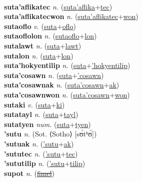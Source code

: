  \label{suta'aflika} \\
\textbf{suta'aflikatec} \textit{n.} (\hyperref[suta'aflika]{suta'aflika}+\hyperref[tec]{tec})
 \label{suta'aflikatec} \\
\textbf{suta'aflikatecwon} \textit{n.} (\hyperref[suta'aflikatec]{suta'aflikatec}+\hyperref[won]{won})
 \label{suta'aflikatecwon} \\
\textbf{sutaoflo} \textit{v.} (\hyperref[suta]{suta}+\hyperref[oflo]{oflo})
 \label{sutaoflo} \\
\textbf{sutaoflolon} \textit{n.} (\hyperref[sutaoflo]{sutaoflo}+\hyperref[lon]{lon})
 \label{sutaoflolon} \\
\textbf{sutalawt} \textit{n.} (\hyperref[suta]{suta}+\hyperref[lawt]{lawt})
 \label{sutalawt} \\
\textbf{sutalon} \textit{n.} (\hyperref[suta]{suta}+\hyperref[lon]{lon})
 \label{sutalon} \\
\textbf{suta'hokyentilip} \textit{n.} (\hyperref[suta]{suta}+\hyperref['hokyentilip]{'hokyentilip})
 \label{suta'hokyentilip} \\
\textbf{suta'cosawn} \textit{n.} (\hyperref[suta]{suta}+\hyperref['cosawn]{'cosawn})
 \label{suta'cosawn} \\
\textbf{suta'cosawnak} \textit{n.} (\hyperref[suta'cosawn]{suta'cosawn}+\hyperref[ak]{ak})
 \label{suta'cosawnak} \\
\textbf{suta'cosawnwon} \textit{n.} (\hyperref[suta'cosawn]{suta'cosawn}+\hyperref[won]{won})
 \label{suta'cosawnwon} \\
\textbf{sutaki} \textit{v.} (\hyperref[suta]{suta}+\hyperref[ki]{ki})
 \label{sutaki} \\
\textbf{sutatayl} \textit{n.} (\hyperref[suta]{suta}+\hyperref[tayl]{tayl})
 \label{sutatayl} \\
\textbf{sutatyen} \textit{num.} (\hyperref[suta]{suta}+\hyperref[tyen]{tyen})
 \label{sutatyen} \\
\textbf{'sutu} \textit{n.} (Sot. ⟨Sotho⟩ [sʊ́tʰʊ̀])
 \label{'sutu} \\
\textbf{'sutuak} \textit{n.} (\hyperref['sutu]{'sutu}+\hyperref[ak]{ak})
 \label{'sutuak} \\
\textbf{'sututec} \textit{n.} (\hyperref['sutu]{'sutu}+\hyperref[tec]{tec})
 \label{'sututec} \\
\textbf{'sututilip} \textit{n.} (\hyperref['sutu]{'sutu}+\hyperref[tilip]{tilip})
 \label{'sututilip} \\
\textbf{supot} \textit{n.} (\hyperref[fimel]{\sout{fimel}})
 \label{supot} \\
